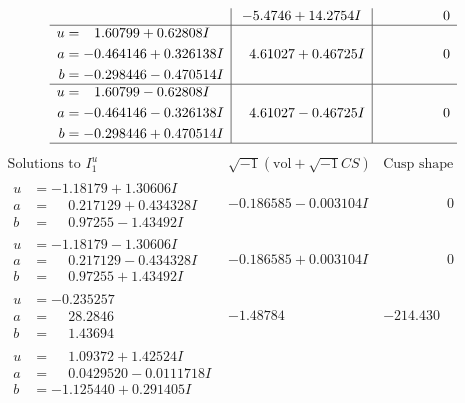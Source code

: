 \documentclass[1p]{elsarticle_modified}
\theoremstyle{definition}
\newcommand{\I}{\sqrt{-1}}
\begin{document}
$$\begin{array}{c|c|c}
 & -5.4746 + 14.2754 I & \phantom{-0.000000 } 0 \\ \hline\begin{aligned}
u &= \phantom{-}1.60799 + 0.62808 I \\
a &= -0.464146 + 0.326138 I \\
b &= -0.298446 - 0.470514 I\end{aligned}
 & \phantom{-}4.61027 + 0.46725 I & \phantom{-0.000000 } 0 \\ \hline\begin{aligned}
u &= \phantom{-}1.60799 - 0.62808 I \\
a &= -0.464146 - 0.326138 I \\
b &= -0.298446 + 0.470514 I\end{aligned}
 & \phantom{-}4.61027 - 0.46725 I & \phantom{-0.000000 } 0\\
 \hline 
 \end{array}$$\newpage$$\begin{array}{c|c|c}  
\text{Solutions to }I^u_{1}& \I (\text{vol} + \sqrt{-1}CS) & \text{Cusp shape}\\
 \hline 
\begin{aligned}
u &= -1.18179 + 1.30606 I \\
a &= \phantom{-}0.217129 + 0.434328 I \\
b &= \phantom{-}0.97255 - 1.43492 I\end{aligned}
 & -0.186585 - 0.003104 I & \phantom{-0.000000 } 0 \\ \hline\begin{aligned}
u &= -1.18179 - 1.30606 I \\
a &= \phantom{-}0.217129 - 0.434328 I \\
b &= \phantom{-}0.97255 + 1.43492 I\end{aligned}
 & -0.186585 + 0.003104 I & \phantom{-0.000000 } 0 \\ \hline\begin{aligned}
u &= -0.235257\phantom{ +0.000000I} \\
a &= \phantom{-}28.2846\phantom{ +0.000000I} \\
b &= \phantom{-}1.43694\phantom{ +0.000000I}\end{aligned}
 & -1.48784\phantom{ +0.000000I} & -214.430\phantom{ +0.000000I} \\ \hline\begin{aligned}
u &= \phantom{-}1.09372 + 1.42524 I \\
a &= \phantom{-}0.0429520 - 0.0111718 I \\
b &= -1.125440 + 0.291405 I\end{aligned}

\end{array}$$
\end{document}
